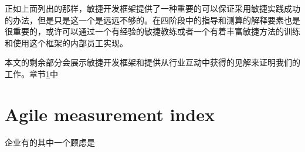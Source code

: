 \documentclass[twocolumn]{svjour3}[]
\begin{document}
正如上面列出的那样，敏捷开发框架提供了一种重要的可以保证采用敏捷实践成功的办法，但是只是这一个是远远不够的。在四阶段中的指导和测算的解释要素也是很重要的，或许可以通过一个有经验的敏捷教练或者一个有着丰富敏捷方法的训练和使用这个框架的内部员工实现。

本文的剩余部分会展示敏捷开发框架和提供从行业互动中获得的见解来证明我们的工作。章节\ref{ami}中

\section{Agile measurement index}
\label{ami}

企业有的其中一个顾虑是



\end{document}
